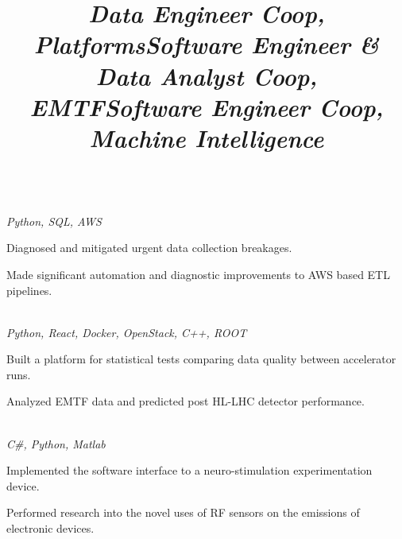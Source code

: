 \documentclass[margin,line,11pt,letterpaper]{res}
\begin{document}
\begin{resume}
    \title{\textit{Data Engineer Coop, Platforms}}
    \begin{position}
        \vspace{-3mm}\\
        \emph{Python, SQL, AWS}
        \begin{list2}
            \item Diagnosed and mitigated urgent data collection breakages. 
            \item Made significant automation and diagnostic improvements to AWS based ETL pipelines.
        \end{list2}
    \end{position}

    \title{\textit{Software Engineer \& Data Analyst Coop, EMTF}}
    \begin{position}
        \vspace{-3mm}\\
        \emph{Python, React, Docker, OpenStack, C++, ROOT}
        \begin{list2}
            \item Built a platform for statistical tests comparing data quality between accelerator runs.
            \item Analyzed EMTF data and predicted post HL-LHC detector performance.
        \end{list2}
    \end{position}

    \title{\textit{Software Engineer Coop, Machine Intelligence}}
    \begin{position}
        \vspace{-3mm}\\
        \emph{C\#, Python, Matlab}
        \begin{list2}
            \item Implemented the software interface to a neuro-stimulation experimentation device.
            \item Performed research into the novel uses of RF sensors on the emissions of electronic devices.
        \end{list2}
    \end{position}
    

\end{resume}
\end{document}
